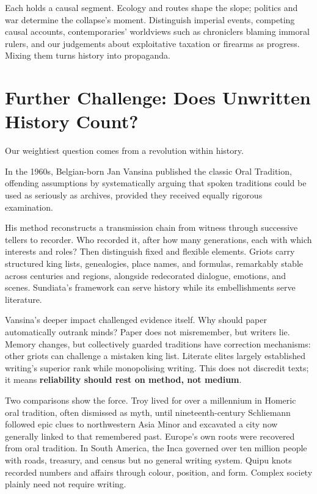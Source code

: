 Each holds a causal segment. Ecology and routes shape the slope; politics and war determine the collapse's moment. Distinguish imperial events, competing causal accounts, contemporaries' worldviews such as chroniclers blaming immoral rulers, and our judgements about exploitative taxation or firearms as progress. Mixing them turns history into propaganda.

\section[Further Challenge: History without Writing]{Further Challenge: Does Unwritten History Count?}
Our weightiest question comes from a revolution within history.

In the 1960s, Belgian-born Jan Vansina published the classic Oral Tradition, offending assumptions by systematically arguing that spoken traditions could be used as seriously as archives, provided they received equally rigorous examination.

His method reconstructs a transmission chain from witness through successive tellers to recorder. Who recorded it, after how many generations, each with which interests and roles? Then distinguish fixed and flexible elements. Griots carry structured king lists, genealogies, place names, and formulas, remarkably stable across centuries and regions, alongside redecorated dialogue, emotions, and scenes. Sundiata's framework can serve history while its embellishments serve literature.

Vansina's deeper impact challenged evidence itself. Why should paper automatically outrank minds? Paper does not misremember, but writers lie. Memory changes, but collectively guarded traditions have correction mechanisms: other griots can challenge a mistaken king list. Literate elites largely established writing's superior rank while monopolising writing. This does not discredit texts; it means \textbf{reliability should rest on method, not medium}.

Two comparisons show the force. Troy lived for over a millennium in Homeric oral tradition, often dismissed as myth, until nineteenth-century Schliemann followed epic clues to northwestern Asia Minor and excavated a city now generally linked to that remembered past. Europe's own roots were recovered from oral tradition. In South America, the Inca governed over ten million people with roads, treasury, and census but no general writing system. Quipu knots recorded numbers and affairs through colour, position, and form. Complex society plainly need not require writing.

